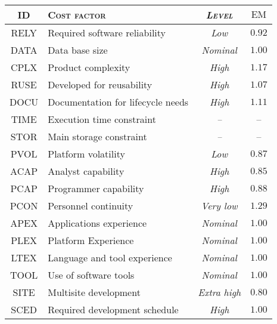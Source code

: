 \begin{table}\begin{tabularx}{\textwidth}{ >{\ttfamily}c X >{\itshape}c c }

\toprule
\normalfont\textsc{ID} & \normalfont\textsc{Cost factor} & \normalfont\textsc{Level} & $ \text{EM} $ \\
\toprule

RELY	& Required software reliability	& Low		& $ 0.92 $ \\ \midrule
DATA	& Data base size					& Nominal	& $ 1.00 $ \\ \midrule
CPLX	& Product complexity				& High		& $ 1.17 $ \\ \midrule
RUSE	& Developed for reusability		& High		& $ 1.07 $ \\ \midrule
DOCU	& Documentation for lifecycle needs		& High		& $ 1.11 $ \\ \midrule

TIME	& Execution time constraint		& --			&    --    \\ \midrule
STOR	& Main storage constraint		& --			&    --    \\ \midrule
PVOL	& Platform volatility			& Low		& $ 0.87 $ \\ \midrule

ACAP	& Analyst capability				& High		& $ 0.85 $ \\ \midrule
PCAP	& Programmer capability			& High		& $ 0.88 $ \\ \midrule
PCON	& Personnel continuity			& Very low	& $ 1.29 $ \\ \midrule
APEX	& Applications experience 		& Nominal	& $ 1.00 $ \\ \midrule
PLEX	& Platform Experience			& Nominal	& $ 1.00 $ \\ \midrule
LTEX	& Language and tool experience	& Nominal	& $ 1.00 $ \\ \midrule

TOOL	& Use of software tools			& Nominal	& $ 1.00 $ \\ \midrule
SITE	& Multisite development			& Extra high	& $ 0.80 $ \\ \midrule
SCED	& Required development schedule	& High		& $ 1.00 $ \\



\bottomrule
	
\end{tabularx}\end{table}







